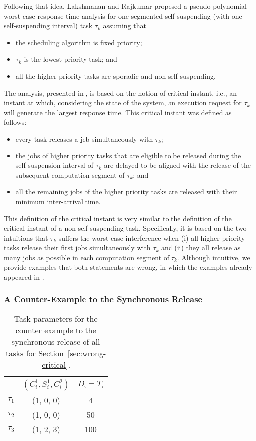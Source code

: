 Following that idea, Lakshmanan and Rajkumar \cite{LR:rtas10} proposed a pseudo-polynomial worst-case response time analysis for one segmented self-suspending (with one self-suspending interval) task $\tau_k$ assuming that 
\begin{itemize}
\item the scheduling algorithm is fixed priority;
\item $\tau_k$ is the lowest priority task;  and
\item all the higher priority tasks are sporadic and non-self-suspending.
\end{itemize}
The analysis, presented in \cite{LR:rtas10}, is based on the notion of critical instant, i.e., an instant at which, considering the state of the system, an execution request for $\tau_k$ will generate the largest response time. This critical instant was defined as follows:
\begin{itemize}
	\item every task releases a job simultaneously with $\tau_k$;
	\item the jobs of higher priority tasks that are eligible to be released during the self-suspension interval of $\tau_k$ are delayed to be aligned with the release of the subsequent computation segment of $\tau_k$; and
	\item all the remaining jobs of the higher priority tasks are released with their minimum inter-arrival time.
\end{itemize}

This definition of the critical instant is very similar to the definition of the critical instant of a non-self-suspending task. Specifically, it is based on the two intuitions that $\tau_k$ suffers the worst-case interference when (i) all higher priority tasks release their first jobs simultaneously with $\tau_k$ and (ii) they all release as many jobs as possible in each computation segment of $\tau_k$. Although intuitive, we provide examples that both statements are wrong, in which the examples already appeared in \cite{ecrts15nelissen}.

\subsubsection{A Counter-Example to the Synchronous Release}

\begin{table} 
\centering
    \begin{tabular}{|c|c|c|}
 \hline
        & $(C_i^1, S_i^1, C_i^2)$ &  $D_i=T_i$\\ 
        \hline
        $\tau_1$ & (1, 0, 0) &  4\\ 
        $\tau_2$ &  (1, 0, 0) & 50  \\ 
        $\tau_3$ & (1, 2, 3) & 100  \\
        \hline
    \end{tabular} 
    \caption{Task parameters for the counter example to the synchronous release of all tasks for Section~\ref{sec:wrong-critical}.}
    \label{table:ex-synch-releases}
\end{table}


